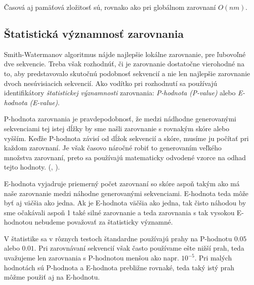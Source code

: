 Časová aj pamäťová zložitosť sú, rovnako ako pri globálnom zarovnaní $O(nm)$.

\subsection{Štatistická významnosť zarovnania}
Smith-Watermanov algoritmus nájde najlepšie lokálne zarovnanie, pre ľubovoľné dve sekvencie. Treba však rozhodnúť, či je zarovnanie dostatočne vierohodné na to, aby predstavovalo skutočnú podobnosť sekvencií a nie len najlepšie zarovnanie dvoch nesúvisiacich sekvencií.
Ako vodítko pri rozhodnutí sa používajú identifikátory \textit{štatistickej významnosti} zarovnania: \textit{P-hodnota (P-value)} alebo \textit{E-hodnota (E-value)}.

P-hodnota zarovnania je pravdepodobnosť, že medzi nádhodne generovanými sekvenciami tej istej dĺžky by sme našli zarovnanie s rovnakým skóre alebo vyšším. Keďže P-hodnota závisí od dĺžok sekvencií a skóre, musíme ju počítať pri každom zarovnaní. Je však časovo náročné robiť to generovaním veľkého množstva zarovnaní, preto sa používajú matematicky odvodené vzorce na odhad tejto hodnoty. (\cite{Karlin}, \cite{Mitrophanov}).

E-hodnota vyjadruje priemerný počet zarovnaní so skóre aspoň takým ako má naše zarovnanie medzi náhodne generovanými sekvenciami. E-hodnota teda môže byť aj väčšia ako jedna. Ak je E-hodnota väčšia ako jedna, tak čisto náhodou by sme očakávali aspoň 1 také silné zarovnanie a teda zarovnania s tak vysokou E-hodnotou nebudeme považovať za štatisticky významné.

V štatistike sa v rôznych testoch štandardne používajú prahy na P-hodnotu $0.05$ alebo $0.01$.
Pri zarovnávaní sekvencií však často používame ešte nižší prah, teda uvažujeme len zarovnania s P-hodnotou menšou ako napr. $10^{-5}$. Pri malých hodnotách sú P-hodnota a E-hodnota prebližne rovnaké, teda taký istý prah môžme použiť aj na E-hodnotu.